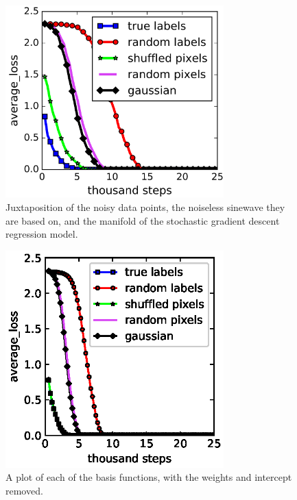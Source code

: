 \documentclass[12pt]{article}
\begin{document}
\begin{figure}[H]
	\centering
	\includegraphics[width=0.75\textwidth]{fig.png}
	\caption{Juxtaposition of the noisy data points, the noiseless sinewave they are based on, and the manifold of the stochastic gradient descent regression model.}
\end{figure}

\begin{figure}[H]
	\centering
	\includegraphics[width=0.75\textwidth]{MiniInceptionV3.eps}
	\caption{A plot of each of the basis functions, with the weights and intercept removed.}
\end{figure}
\end{document}
